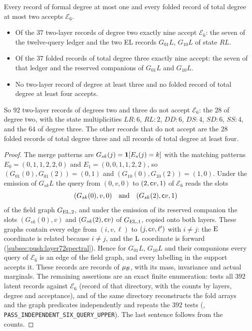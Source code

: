 \begin{lemma}\label{lem:six-query-retention}
Every record of formal degree at most one and every folded record of total
degree at most two accepts $\mathcal E_6$.
\begin{itemize}
\item Of the $37$ two-layer records of degree two exactly nine accept
 $\mathcal E_6$: the seven of the twelve-query ledger and the two EL records
 $G_{01}L$, $G_{10}L$ of state $RL$.
\item Of the $37$ folded records of total degree three exactly nine accept: the
 seven of that ledger and the reserved companions of $G_{01}L$ and $G_{10}L$.
\item No two-layer record of degree at least three and no folded record of total
 degree at least four accepts.
\end{itemize}
So $92$ two-layer records of degrees two and three do not accept $\mathcal E_6$:
the $28$ of degree two, with the state multiplicities $LR\colon6$, $RL\colon2$,
$DD\colon6$, $DS\colon4$, $SD\colon6$, $SS\colon4$, and the $64$ of degree three.
The other records that do not accept are the $28$ folded records of total degree
three and all records of total degree at least four.
\end{lemma}

\begin{proof}
The merge patterns are $G_{sk}(j)=\mathbf 1[E_s(j)=k]$ with the matching patterns
$E_0=(0,1,1,2,2,0)$ and $E_1=(0,0,1,1,2,2)$, so
$(G_{01}(0),G_{01}(2))=(0,1)$ and $(G_{10}(0),G_{10}(2))=(1,0)$. Under the emission
of $G_{sk}L$ the query from $(0,v,0)$ to $(2,\mathsf c v,1)$ of $\mathcal E_6$ reads the
slots
\[
 (G_{sk}(0),v,0)\quad\text{and}\quad(G_{sk}(2),\mathsf c v,1)
\]
of the field graph $G_{{\rm EL},2}$, and under the emission of its reserved
companion the slots $(G_{sk}(0),v)$ and $(G_{sk}(2),\mathsf c v)$ of $G_{{\rm EL},1}$,
copied onto both layers. These graphs contain every edge from $(i,v,\ell)$ to
$(j,\mathsf c v,\ell')$ with $i\ne j$: the $\rm E$ coordinate is related because $i\ne j$,
and the $\rm L$ coordinate is forward (\cref{subsec:push:layer72spectral}). Hence for $G_{01}L$, $G_{10}L$ and their
companions every query of $\mathcal E_6$ is an edge of the field graph, and every
labelling in the support accepts it. These records are records of $\mu_\mathcal B$, with
its mass, invariance and actual marginals. The remaining assertions are an exact
finite enumeration: 
tests all $392$ latent records against $\mathcal E_6$ (record
 of that directory, with the counts by layers,
degree and acceptance), and  of the same directory
reconstructs the fold arrays and the graph predicates independently and repeats
the $392$ tests (,
\texttt{PASS\_\allowbreak INDEPENDENT\_\allowbreak SIX\_\allowbreak QUERY\_\allowbreak UPPER}). The last sentence follows from
the counts.
\end{proof}


